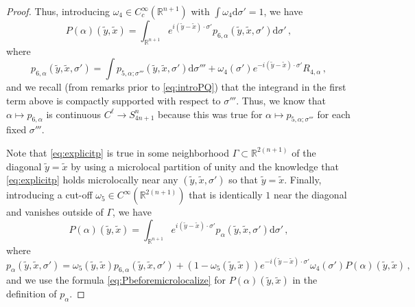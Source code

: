 \documentclass[11pt]{amsart}
\theoremstyle{definition}
\numberwithin{equation}{section}
\newcommand{\mR}{\mathbb{R}}                    %
\newcommand{\dd}{\mathrm{d}}
\begin{document}
\begin{proof}
    Thus, introducing $\omega_4 \in C_c^\infty(\mR^{n+1})$ with $\int \omega_4 \dd\sigma' = 1$, we have
    \begin{equation}\label{eq:explicitp}
        P(\alpha)(\tilde{y},\tilde{x}) = \int_{\mR^{n+1}} e^{i(\tilde{y}-\tilde{x})\cdot\sigma'}p_{6,\alpha}(\tilde{y},\tilde{x},\sigma') \dd\sigma'\,,
    \end{equation}
    where
	\[
		p_{6,\alpha}(\tilde{y},\tilde{x},\sigma') = \int %
        p_{5,\alpha;\sigma'''}(\tilde{y},\tilde{x},\sigma')\dd\sigma'''+ \omega_4(\sigma')e^{-i(\tilde{y}-\tilde{x})\cdot\sigma'}R_{4,\alpha}\,,
	\]
	and we recall (from remarks prior to \eqref{eq:introPQ}) that the integrand in the first term above is compactly supported with respect to $\sigma'''$. Thus, we know that $\alpha\mapsto p_{6,\alpha}$ is continuous $C^{\ell} \to S^n_{4n+1}$ because this was true for $\alpha\mapsto p_{5,\alpha;\sigma'''}$ for each fixed $\sigma'''$.

    Note that \eqref{eq:explicitp} is true in some neighborhood $\Gamma \subset \mR^{2(n+1)}$ of the diagonal $\tilde{y}=\tilde{x}$ by using a microlocal partition of unity and the knowledge that \eqref{eq:explicitp} holds microlocally near any $(\tilde{y},\tilde{x},\sigma')$ so that $\tilde{y}=\tilde{x}$. Finally, introducing a cut-off $\omega_5 \in C^\infty(\mR^{2(n+1)})$ that is identically $1$ near the diagonal and vanishes outside of $\Gamma$, we have 
    \begin{equation}\label{eq:finalformulaP}
        P(\alpha)(\tilde{y},\tilde{x}) = \int_{\mR^{n+1}}e^{i(\tilde{y}-\tilde{x})\cdot\sigma'} p_\alpha(\tilde{y},\tilde{x},\sigma')\dd\sigma'\,,
    \end{equation}
    where
    \[
        p_\alpha(\tilde{y},\tilde{x},\sigma') = \omega_5(\tilde{y},\tilde{x})p_{6,\alpha}(\tilde{y},\tilde{x},\sigma') + (1-\omega_5(\tilde{y},\tilde{x}))e^{-i(\tilde{y}-\tilde{x})\cdot\sigma'}\omega_4(\sigma')P(\alpha)(\tilde{y},\tilde{x})\,,
    \]
    and we use the formula \eqref{eq:Pbeforemicrolocalize} for $P(\alpha)(\tilde{y},\tilde{x})$ in the definition of $p_\alpha$.%


\end{proof}
\end{document}

